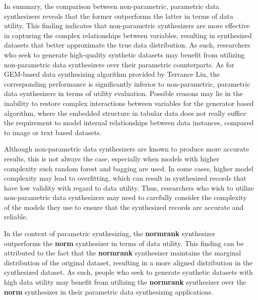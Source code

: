 In summary, the comparison between non-parametric, parametric data synthesizers reveals that the former outperforms the latter in terms of data utility. This finding indicates that non-parametric synthesizers are more effective in capturing the complex relationships between variables, resulting in synthesized datasets that better approximate the true data distribution. As such, researchers who seek to generate high-quality synthetic datasets may benefit from utilizing non-parametric data synthesizers over their parametric counterparts. As for GEM-based data synthesizing algorithm provided by Terrance Liu, the corresponding performance is significantly inferior to non-parametric, parametric data synthesizers in terms of utility evaluation. Possible reasons may lie in the inability to restore complex interactions between variables for the generator based algorithm, where the embedded structure in tabular data does not really suffice the requirement to model internal relationships between data instances, compared to image or text based datasets.

Although non-parametric data synthesizers are known to produce more accurate results, this is not always the case, especially when models with higher complexity such random forest and bagging are used. In some cases, higher model complexity may lead to overfitting, which can result in synthesized records that have low validity with regard to data utility. Thus, researchers who wish to utilize non-parametric data synthesizers may need to carefully consider the complexity of the models they use to ensure that the synthesized records are accurate and reliable.

In the context of parametric synthesizing, the \textbf{normrank} synthesizer outperforms the \textbf{norm} synthesizer in terms of data utility. This finding can be attributed to the fact that the \textbf{normrank} synthesizer maintains the marginal distribution of the original dataset, resulting in a more aligned distribution in the synthesized dataset. As such, people who seek to generate synthetic datasets with high data utility may benefit from utilizing the \textbf{normrank} synthesizer over the \textbf{norm} synthesizer in their parametric data synthesizing applications.

